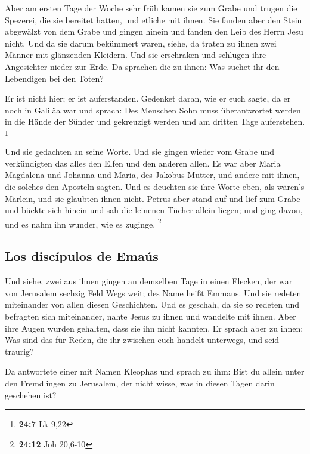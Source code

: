  Aber am ersten Tage der Woche sehr früh kamen sie zum
Grabe und trugen die Spezerei, die sie bereitet hatten, und etliche mit
ihnen.  Sie fanden aber den Stein abgewälzt von dem Grabe
 und gingen hinein und fanden den Leib des Herrn Jesu
nicht.  Und da sie darum bekümmert waren, siehe, da traten
zu ihnen zwei Männer mit glänzenden Kleidern.  Und sie
erschraken und schlugen ihre Angesichter nieder zur Erde. Da sprachen
die zu ihnen: Was suchet ihr den Lebendigen bei den Toten?

 Er ist nicht hier; er ist auferstanden. Gedenket daran,
wie er euch sagte, da er noch in Galiläa war  und sprach:
Des Menschen Sohn muss überantwortet werden in die Hände der Sünder und
gekreuzigt werden und am dritten Tage auferstehen. \footnote{\textbf{24:7}
  Lk 9,22}

 Und sie gedachten an seine Worte.  Und sie
gingen wieder vom Grabe und verkündigten das alles den Elfen und den
anderen allen.  Es war aber Maria Magdalena und Johanna
und Maria, des Jakobus Mutter, und andere mit ihnen, die solches den
Aposteln sagten.  Und es deuchten sie ihre Worte eben,
als wären's Märlein, und sie glaubten ihnen nicht. 
Petrus aber stand auf und lief zum Grabe und bückte sich hinein und sah
die leinenen Tücher allein liegen; und ging davon, und es nahm ihn
wunder, wie es zuginge. \footnote{\textbf{24:12} Joh 20,6-10}

\hypertarget{los-discuxedpulos-de-emauxfas}{%
\subsection{Los discípulos de
Emaús}\label{los-discuxedpulos-de-emauxfas}}

 Und siehe, zwei aus ihnen gingen an demselben Tage in
einen Flecken, der war von Jerusalem sechzig Feld Wegs weit; des Name
heißt Emmaus.  Und sie redeten miteinander von allen
diesen Geschichten.  Und es geschah, da sie so redeten
und befragten sich miteinander, nahte Jesus zu ihnen und wandelte mit
ihnen.  Aber ihre Augen wurden gehalten, dass sie ihn
nicht kannten.  Er sprach aber zu ihnen: Was sind das für
Reden, die ihr zwischen euch handelt unterwegs, und seid traurig?

 Da antwortete einer mit Namen Kleophas und sprach zu
ihm: Bist du allein unter den Fremdlingen zu Jerusalem, der nicht wisse,
was in diesen Tagen darin geschehen ist?

